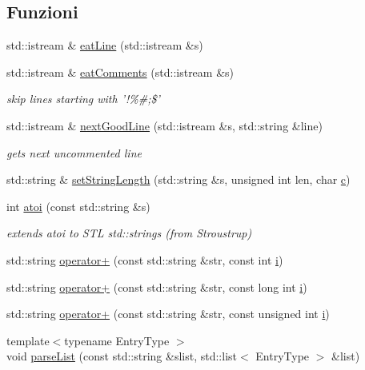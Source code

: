 \subsection*{Funzioni}
\begin{DoxyCompactItemize}
\item 
std\-::istream \& \hyperlink{namespaceLifeV_aa91d4c3fafd93fcbfb7d0aca2b771a02}{eat\-Line} (std\-::istream \&s)
\item 
std\-::istream \& \hyperlink{namespaceLifeV_aecf5099a32c6f096d09d0506ee79255b}{eat\-Comments} (std\-::istream \&s)
\begin{DoxyCompactList}\small\item\em skip lines starting with '!\%\#;\$' \end{DoxyCompactList}\item 
std\-::istream \& \hyperlink{namespaceLifeV_a2c4dd8a300964aa48909fce6ad5c72f5}{next\-Good\-Line} (std\-::istream \&s, std\-::string \&line)
\begin{DoxyCompactList}\small\item\em gets next uncommented line \end{DoxyCompactList}\item 
std\-::string \& \hyperlink{namespaceLifeV_a5fb0107fd71b5be2c32f536619a73175}{set\-String\-Length} (std\-::string \&s, unsigned int len, char \hyperlink{matrici_8m_ae0323a9039add2978bf5b49550572c7c}{c})
\item 
int \hyperlink{namespaceLifeV_a1a787279805886c5b208055992c29c9a}{atoi} (const std\-::string \&s)
\begin{DoxyCompactList}\small\item\em extends atoi to S\-T\-L std\-::strings (from Stroustrup) \end{DoxyCompactList}\item 
std\-::string \hyperlink{namespaceLifeV_af57500c586141320ace55cf0b2a5c9fe}{operator+} (const std\-::string \&str, const int \hyperlink{matrici_8m_a6f6ccfcf58b31cb6412107d9d5281426}{i})
\item 
std\-::string \hyperlink{namespaceLifeV_ae00b5ce86e0f837f3f3392074652b7ed}{operator+} (const std\-::string \&str, const long int \hyperlink{matrici_8m_a6f6ccfcf58b31cb6412107d9d5281426}{i})
\item 
std\-::string \hyperlink{namespaceLifeV_a54f5fa0ff0002920c744bcbaff350bc0}{operator+} (const std\-::string \&str, const unsigned int \hyperlink{matrici_8m_a6f6ccfcf58b31cb6412107d9d5281426}{i})
\item 
{\footnotesize template$<$typename Entry\-Type $>$ }\\void \hyperlink{namespaceLifeV_a200b22ebae8c113c2624f7195797d4a4}{parse\-List} (const std\-::string \&slist, std\-::list$<$ Entry\-Type $>$ \&list)

\end{DoxyCompactItemize}
